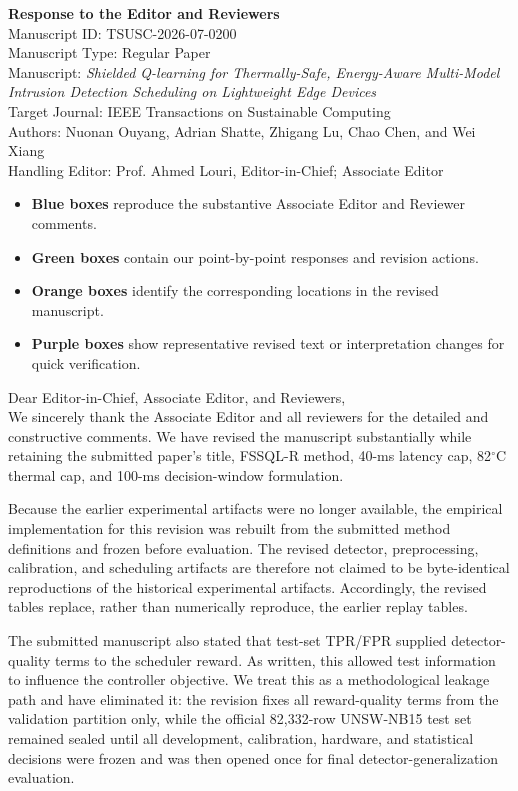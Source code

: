 \documentclass[11pt,a4paper]{article}
\newcommand{\paperid}{TSUSC-2026-07-0200}
\newcommand{\manutitle}{Shielded Q-learning for Thermally-Safe, Energy-Aware Multi-Model Intrusion Detection Scheduling on Lightweight Edge Devices}
\newcommand{\journal}{IEEE Transactions on Sustainable Computing}
\newcommand{\authors}{Nuonan Ouyang, Adrian Shatte, Zhigang Lu, Chao Chen, and Wei Xiang}
\newcommand{\editor}{Prof. Ahmed Louri, Editor-in-Chief; Associate Editor}
\begin{document}
\begin{center}
{\LARGE \textbf{Response to the Editor and Reviewers}}\\[6pt]
{\large Manuscript ID: \paperid}\\
{\large Manuscript Type: Regular Paper}\\
{\large Manuscript: \emph{\manutitle}}\\
{\large Target Journal: \journal}\\[4pt]
{\large Authors: \authors}\\
{\large Handling Editor: \editor}
\end{center}
\begin{tcolorbox}[colback=SoftGray,colframe=black!10,title=\textbf{How to Read This Letter}]
\begin{itemize}
  \item \textcolor{ReviewerBlue}{\textbf{Blue boxes}} reproduce the substantive Associate Editor and Reviewer comments.
  \item \textcolor{AuthorGreen}{\textbf{Green boxes}} contain our point-by-point responses and revision actions.
  \item \textcolor{WhereOrange}{\textbf{Orange boxes}} identify the corresponding locations in the revised manuscript.
  \item \textcolor{ExcerptPurple}{\textbf{Purple boxes}} show representative revised text or interpretation changes for quick verification.
\end{itemize}
\end{tcolorbox}
\begin{authorresponsebox}
Dear Editor-in-Chief, Associate Editor, and Reviewers,\\[3pt]
We sincerely thank the Associate Editor and all reviewers for the detailed and constructive comments. We have revised the manuscript substantially while retaining the submitted paper's title, FSSQL-R method, 40-ms latency cap, 82$^\circ$C thermal cap, and 100-ms decision-window formulation.

Because the earlier experimental artifacts were no longer available, the empirical implementation for this revision was rebuilt from the submitted method definitions and frozen before evaluation. The revised detector, preprocessing, calibration, and scheduling artifacts are therefore not claimed to be byte-identical reproductions of the historical experimental artifacts. Accordingly, the revised tables replace, rather than numerically reproduce, the earlier replay tables.

The submitted manuscript also stated that test-set TPR/FPR supplied detector-quality terms to the scheduler reward. As written, this allowed test information to influence the controller objective. We treat this as a methodological leakage path and have eliminated it: the revision fixes all reward-quality terms from the validation partition only, while the official 82,332-row UNSW-NB15 test set remained sealed until all development, calibration, hardware, and statistical decisions were frozen and was then opened once for final detector-generalization evaluation.
\end{authorresponsebox}
\end{document}
